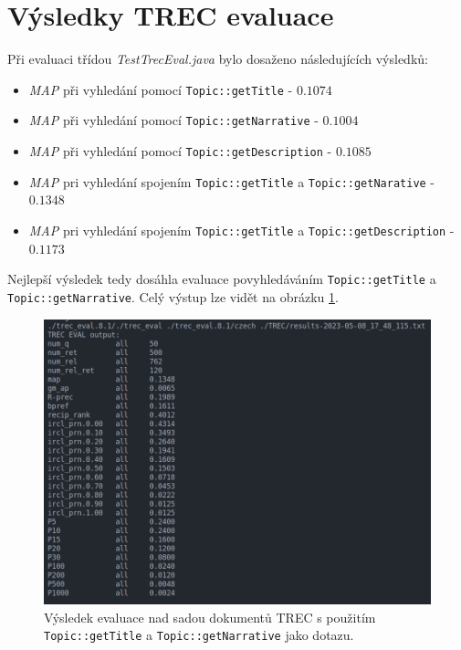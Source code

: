 \documentclass{article}
\begin{document}
\section{Výsledky TREC evaluace}
Při evaluaci třídou \textit{TestTrecEval.java} bylo dosaženo následujících výsledků:
\begin{itemize}
    \item \textit{MAP} při vyhledání pomocí \texttt{Topic::getTitle} - \(0.1074\)
    \item \textit{MAP} při vyhledání pomocí \texttt{Topic::getNarrative} - \(0.1004\)
    \item \textit{MAP} při vyhledání pomocí \texttt{Topic::getDescription} - \(0.1085\)
    \item \textit{MAP} pri vyhledání spojením \texttt{Topic::getTitle} a \texttt{Topic::getNarative} - \(0.1348\)
    \item \textit{MAP} pri vyhledání spojením \texttt{Topic::getTitle} a \texttt{Topic::getDescription} - \(0.1173\)
\end{itemize}

Nejlepší výsledek tedy dosáhla evaluace povyhledáváním \texttt{Topic::getTitle} a \texttt{Topic::getNarrative}. Celý výstup lze vidět na obrázku \ref{fig:trec-eval}.

\begin{figure}[!h]
    \centering
    \includegraphics[width=\columnwidth]{img/trec-eval.png}
    \caption{Výsledek evaluace nad sadou dokumentů TREC s použitím \texttt{Topic::getTitle} a \texttt{Topic::getNarrative} jako dotazu.}
    \label{fig:trec-eval}
\end{figure}
\end{document}
